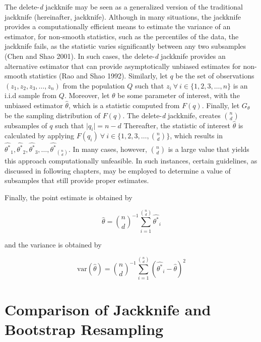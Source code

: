 \documentclass[
  letterpaper,
  DIV=11,
  numbers=noendperiod]{scrreprt}
\begin{document}
The delete-\emph{d} jackknife may be seen as a generalized version of
the traditional jackknife (hereinafter, jackknife). Although in many
situations, the jackknife provides a computationally efficient means to
estimate the variance of an estimator, for non-smooth statistics, such
as the percentiles of the data, the jackknife fails, as the statistic
varies significantly between any two subsamples (Chen and Shao 2001). In
such cases, the delete-\emph{d} jackknife provides an alternative
estimator that can provide asymptotically unbiased estimates for
non-smooth statistics (Rao and Shao 1992). Similarly, let \(q\) be the
set of observations \(\left(z_1, z_2, z_3, \dots, z_n \right)\) from the
population \(Q\) such that
\(z_i \ \forall \ i \in \{1, 2, 3, \dots, n\}\) is an i.i.d sample from
\(Q\). Moreover, let \(\theta\) be some parameter of interest, with the
unbiased estimator \(\hat{\theta}\), which is a statistic computed from
\(F(q)\). Finally, let \(G_{\theta}\) be the sampling distribution of
\(F(q)\). The delete-\emph{d} jackknife, creates \(n \choose d\)
subsamples of \(q\) such that \(\lvert q_i \rvert = n-d\) Thereafter,
the statistic of interest \(\hat{\theta}\) is calculated by applying
\(F(q_i) \ \forall \ i \in \{1, 2, 3, \dots, {n \choose d} \}\), which
results in
\(\hat{\theta^*}_1, \hat{\theta^*}_2, \hat{\theta^*}_3, \dots, \hat{\theta^*}_{n \choose d}\).
In many cases, however, \(n \choose d\) is a large value that yields
this approach computationally unfeasible. In such instances, certain
guidelines, as discussed in following chapters, may be employed to
determine a value of subsamples that still provide proper estimates.

Finally, the point estimate is obtained by

\[ 
\hat{\theta} = {n \choose d}^{-1}\sum^{n \choose d}_{i = 1} \hat{\theta^*}_i
\]

and the variance is obtained by

\[
\text{var}(\hat{\theta}) = {n \choose d}^{-1}\sum^{n \choose d}_{i = 1} \left(\hat{\theta^*}_i - \hat{\theta}\right)^2
\]

\hypertarget{comparison-of-jackknife-and-bootstrap-resampling}{%
\section{Comparison of Jackknife and Bootstrap
Resampling}\label{comparison-of-jackknife-and-bootstrap-resampling}}
\end{document}
